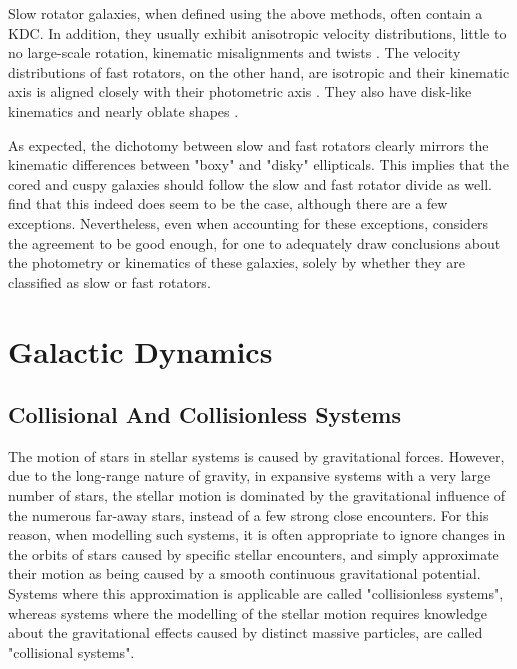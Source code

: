 \documentclass[english, twoside]{HYgradu}
\begin{document}
Slow rotator galaxies, when defined using the above methods, often contain a KDC. In addition, they usually exhibit anisotropic velocity distributions, little to no large-scale rotation, kinematic misalignments and twists \citep{Emsellem2007, Cappellari2007}. The velocity distributions of fast rotators, on the other hand, are isotropic and their kinematic axis is aligned closely with their photometric axis \citep{Emsellem2007}. They also have disk-like kinematics and nearly oblate shapes \citep{Cappellari2007}. 

As expected, the dichotomy between slow and fast rotators clearly mirrors the kinematic differences between "boxy" and "disky" ellipticals. This implies that the cored and cuspy galaxies should follow the slow and fast rotator divide as well. \cite{Krajnovic2013} find that this indeed does seem to be the case, although there are a few exceptions. Nevertheless, even when accounting for these exceptions, \cite{Cappellari2016} considers the agreement to be good enough, for one to adequately draw conclusions about the photometry or kinematics of these galaxies, solely by whether they are classified as slow or fast rotators.

\section{Galactic Dynamics}

\subsection{Collisional And Collisionless Systems} \label{section:collisionless}

The motion of stars in stellar systems is caused by gravitational forces. However, due to the long-range nature of gravity, in expansive systems with a very large number of stars, the stellar motion is dominated by the gravitational influence of the numerous far-away stars, instead of a few strong close encounters. For this reason, when modelling such systems, it is often appropriate to ignore changes in the orbits of stars caused by specific stellar encounters, and simply approximate their motion as being caused by a smooth continuous gravitational potential. Systems where this approximation is applicable are called "collisionless systems", whereas systems where the modelling of the stellar motion requires knowledge about the gravitational effects caused by distinct massive particles, are called "collisional systems".
\end{document}
